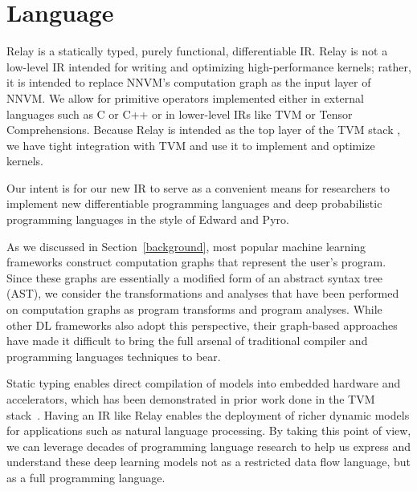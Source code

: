 \section{Language}

Relay is a statically typed, purely functional, differentiable IR.
Relay is not a low-level IR intended for writing and optimizing high-performance
kernels; rather, it is intended to replace NNVM's computation graph as the input
layer of NNVM. We allow for primitive operators implemented either in external languages
such as C or C++ or in lower-level IRs like TVM or Tensor Comprehensions.
Because Relay is intended as the top layer of the TVM stack \cite{TVMSysML},
we have tight integration with TVM and use it to implement and optimize kernels.

Our intent is for our new IR to serve as a convenient means for researchers
to implement new differentiable programming languages and deep
probabilistic programming languages in the style of Edward and Pyro.

As we discussed in Section~\ref{background}, most popular machine learning
frameworks construct computation graphs that represent the user's program.
Since these graphs are essentially a modified form of an abstract syntax
tree (AST), we consider the transformations and analyses that have been
performed on computation graphs as program transforms and program analyses.
While other DL frameworks also adopt this perspective, their graph-based
approaches have made it difficult to bring the full arsenal of traditional
compiler and programming languages techniques to bear.

Static typing enables direct compilation of models into embedded hardware and
accelerators, which has been demonstrated in prior work done in the TVM
stack~\cite{TVMSysML}.  Having an IR like Relay enables the deployment of
richer dynamic models for applications such as natural language processing.  By
taking this point of view, we can leverage decades of programming language
research to help us express and understand these deep learning models not as a
restricted data flow language, but as a full programming language.

